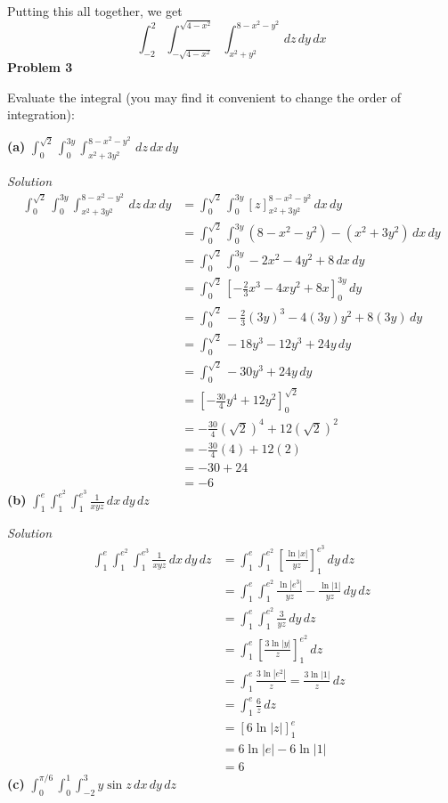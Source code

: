 \documentclass{article}
\newcommand{\lrp}[1]{\left( #1 \right)}
\newcommand{\lrb}[1]{\left[ #1 \right]}
\newcommand{\Solution}{\textit{Solution}}
\begin{document}
Putting this all together, we get
\begin{equation*}
    \int_{-2}^2 \int_{-\sqrt{4-x^2}}^{\sqrt{4-x^2}}\int_{x^2+y^2}^{8-x^2-y^2}\,dz\,dy\,dx
\end{equation*}
\newpage
\textbf{Problem 3}

Evaluate the integral (you may find it convenient to change the order of integration):

\textbf{(a)} $\displaystyle \int_0^{\sqrt{2}}\int_0^{3y}\int_{x^2+3y^2}^{8-x^2-y^2}\,dz\,dx\,dy$

\Solution
\begin{align*}
    \int_0^{\sqrt{2}}\int_0^{3y}\int_{x^2+3y^2}^{8-x^2-y^2}\,dz\,dx\,dy&=\int_0^{\sqrt{2}}\int_0^{3y}\lrb{z}_{x^2+3y^2}^{8-x^2-y^2}\,dx\,dy\\
    &= \int_0^{\sqrt{2}}\int_0^{3y}\lrp{8-x^2-y^2}-\lrp{x^2+3y^2}\,dx\,dy\\
    &= \int_0^{\sqrt{2}}\int_0^{3y} -2x^2 -4y^2 + 8\,dx\,dy\\
    &=\int_0^{\sqrt{2}}\lrb{-\frac{2}{3}x^3-4xy^2+8x}_0^{3y}\,dy\\
    &=\int_0^{\sqrt{2}}-\frac{2}{3}\lrp{3y}^3 -4(3y)y^2+8(3y)\,dy\\
    &=\int_0^{\sqrt{2}}-18y^3-12y^3+24y\,dy\\
    &=\int_0^{\sqrt{2}} -30y^3+24y\,dy\\
    &=\lrb{-\frac{30}{4}y^4+12y^2}_0^{\sqrt{2}}\\
    &=-\frac{30}{4}\lrp{\sqrt{2}}^4+12\lrp{\sqrt{2}}^2\\
    &=-\frac{30}{4}\lrp{4}+12(2)\\
    &=-30+24\\
    &=\boxed{-6}
\end{align*}
\newpage
\textbf{(b)} $\displaystyle \int_1^e\int_1^{e^2}\int_1^{e^3}\frac{1}{xyz}\,dx\,dy\,dz$

\Solution
\begin{align*}
    \int_1^e\int_1^{e^2}\int_1^{e^3}\frac{1}{xyz}\,dx\,dy\,dz&=\int_1^e\int_1^{e^2}\lrb{\frac{\ln\left|x\right|}{yz}}_1^{e^3}\,dy\,dz\\
    &=\int_1^e\int_1^{e^2} \frac{\ln \left|e^3\right|}{yz}-\frac{\ln \left|1\right|}{yz}\,dy\,dz\\
    &=\int_1^e\int_1^{e^2} \frac{3}{yz}\,dy\,dz\\
    &=\int_1^e\lrb{\frac{3\ln \left|y\right|}{z}}_1^{e^2}\,dz\\
    &=\int_1^e \frac{3\ln \left|e^2\right|}{z}=\frac{3\ln\left|1\right|}{z}\,dz\\
    &=\int_1^e \frac{6}{z}\,dz\\
    &=\lrb{6\ln\left|z\right|}_1^e\\
    &=6\ln\left|e\right|-6\ln\left|1\right|\\
    &=\boxed{6}
\end{align*}
\textbf{(c)} $\displaystyle \int_0^{\pi/6}\int_0^1\int_{-2}^3 y\sin z \,dx\,dy\,dz$
\end{document}
